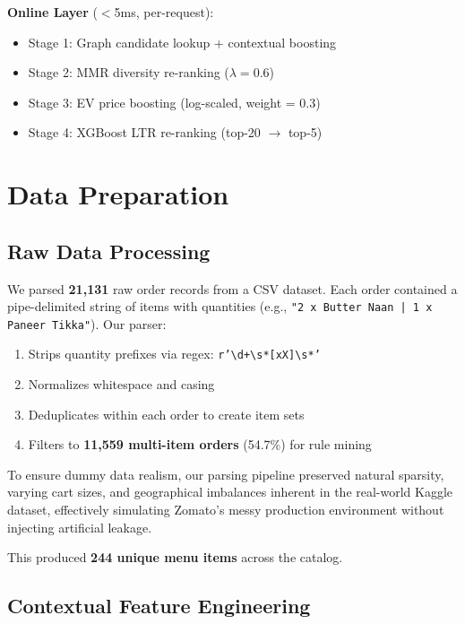 \documentclass[10pt, twocolumn, a4paper]{article}
\begin{document}
\textbf{Online Layer} ($<$5ms, per-request):
\begin{itemize}
    \item Stage 1: Graph candidate lookup + contextual boosting
    \item Stage 2: MMR diversity re-ranking ($\lambda = 0.6$)
    \item Stage 3: EV price boosting (log-scaled, weight = 0.3)
    \item Stage 4: XGBoost LTR re-ranking (top-20 $\to$ top-5)
\end{itemize}

\section{Data Preparation}

\subsection{Raw Data Processing}

We parsed \textbf{21,131} raw order records from a CSV dataset. Each order contained a pipe-delimited string of items with quantities (e.g., \texttt{"2 x Butter Naan | 1 x Paneer Tikka"}). Our parser:

\begin{enumerate}
    \item Strips quantity prefixes via regex: \texttt{r'\textbackslash d+\textbackslash s*[xX]\textbackslash s*'}
    \item Normalizes whitespace and casing
    \item Deduplicates within each order to create item sets
    \item Filters to \textbf{11,559 multi-item orders} (54.7\%) for rule mining
\end{enumerate}

To ensure dummy data realism, our parsing pipeline preserved natural sparsity, varying cart sizes, and geographical imbalances inherent in the real-world Kaggle dataset, effectively simulating Zomato's messy production environment without injecting artificial leakage.

This produced \textbf{244 unique menu items} across the catalog.

\subsection{Contextual Feature Engineering}
\end{document}
